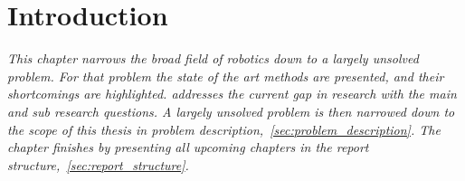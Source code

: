 \chapter{Introduction}%
\label{chap:introduction}
\textit{This chapter narrows the broad field of robotics down to a largely unsolved problem. For that problem the state of the art methods are presented, and their shortcomings are highlighted.  addresses the current gap in research with the main and sub research questions. A largely unsolved problem is then narrowed down to the scope of this thesis in problem description,~\cref{sec:problem_description}. The chapter finishes by presenting all upcoming chapters in the report structure,~\cref{sec:report_structure}.\bs}



